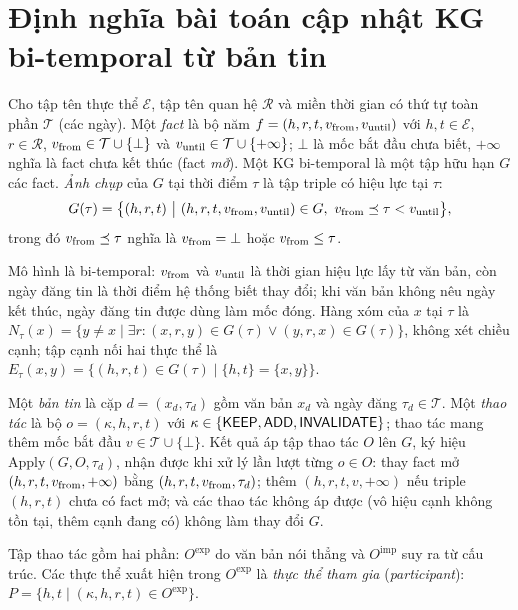 \section{Định nghĩa bài toán cập nhật KG bi-temporal từ bản tin}\label{sec:problem}

\begin{defn}[KG bi-temporal]\label{def:kg}
Cho tập tên thực thể $\mathcal{E}$, tập tên quan hệ $\mathcal{R}$ và miền thời gian có thứ tự toàn phần $\mathcal{T}$ (các ngày).
Một \emph{fact} là bộ năm $f=(h,r,t,v_{\mathrm{from}},v_{\mathrm{until}})$ với $h,t\in\mathcal{E}$, $r\in\mathcal{R}$, $v_{\mathrm{from}}\in\mathcal{T}\cup\{\bot\}$ và $v_{\mathrm{until}}\in\mathcal{T}\cup\{+\infty\}$; $\bot$ là mốc bắt đầu chưa biết, $+\infty$ nghĩa là fact chưa kết thúc (fact \emph{mở}).
Một KG bi-temporal là một tập hữu hạn $G$ các fact.
\emph{Ảnh chụp} của $G$ tại thời điểm $\tau$ là tập triple có hiệu lực tại $\tau$:
\[
G(\tau)=\bigl\{(h,r,t)\ \big|\ (h,r,t,\vfrom,\vuntil)\in G,\ \vfrom\preceq\tau<\vuntil\bigr\},
\]
trong đó $v_{\mathrm{from}}\preceq\tau$ nghĩa là $v_{\mathrm{from}}=\bot$ hoặc $v_{\mathrm{from}}\le\tau$.
\end{defn}

Mô hình là bi-temporal: $v_{\mathrm{from}}$ và $v_{\mathrm{until}}$ là thời gian hiệu lực lấy từ văn bản, còn ngày đăng tin là thời điểm hệ thống biết thay đổi; khi văn bản không nêu ngày kết thúc, ngày đăng tin được dùng làm mốc đóng.
Hàng xóm của $x$ tại $\tau$ là $N_\tau(x)=\{y\neq x \mid \exists r: (x,r,y)\in G(\tau)\lor(y,r,x)\in G(\tau)\}$, không xét chiều cạnh; tập cạnh nối hai thực thể là $E_\tau(x,y)=\{(h,r,t)\in G(\tau)\mid \{h,t\}=\{x,y\}\}$.

\begin{defn}\label{def:ops}
Một \emph{bản tin} là cặp $d=(x_d,\tau_d)$ gồm văn bản $x_d$ và ngày đăng $\tau_d\in\mathcal{T}$.
Một \emph{thao tác} là bộ $o=(\kappa,h,r,t)$ với $\kappa\in\{\textsf{KEEP},\textsf{ADD},\textsf{INVALIDATE}\}$; thao tác  mang thêm mốc bắt đầu $v\in\mathcal{T}\cup\{\bot\}$.
Kết quả áp tập thao tác $O$ lên $G$, ký hiệu $\mathrm{Apply}(G,O,\tau_d)$, nhận được khi xử lý lần lượt từng $o\in O$:
 thay fact mở $(h,r,t,v_{\mathrm{from}},+\infty)$ bằng $(h,r,t,v_{\mathrm{from}},\tau_d)$;
 thêm $(h,r,t,v,+\infty)$ nếu triple $(h,r,t)$ chưa có fact mở;
 và các thao tác không áp được (vô hiệu cạnh không tồn tại, thêm cạnh đang có) không làm thay đổi $G$.
\end{defn}

Tập thao tác gồm hai phần: $O^{\mathrm{exp}}$ do văn bản nói thẳng và $O^{\mathrm{imp}}$ suy ra từ cấu trúc.
Các thực thể xuất hiện trong $O^{\mathrm{exp}}$ là \emph{thực thể tham gia} (\textit{participant}): $P=\{h,t\mid(\kappa,h,r,t)\in O^{\mathrm{exp}}\}$.

